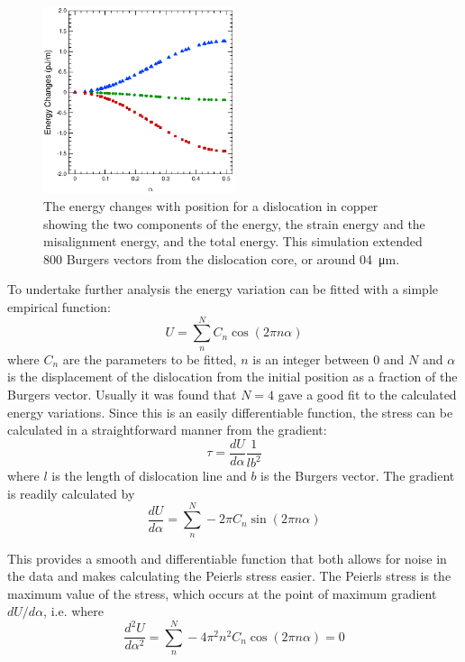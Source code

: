 \begin{figure}
\centering
\includegraphics[width=0.5\textwidth]{Copper_800_rel_energies}
\caption[The energy changes with dislocation position for  copper.]{The energy changes with position for a dislocation in copper showing the two components of the energy, the strain energy and the misalignment energy, and the total energy. This simulation extended \num{800} Burgers vectors from the dislocation core, or around \SI{04}{\micro\meter}.\label{fig:copper_800_rel_energies}}
\end{figure}




To undertake further analysis the energy variation can be fitted with a simple empirical function:
\begin{equation}
U = \sum^N_n C_n \cos (2 \pi n \alpha) \label{eqn:empirical_function}
\end{equation}
where $C_n$ are the parameters to be fitted, $n$ is an integer between $0$ and $N$ and $\alpha$ is the displacement of the dislocation from the initial position as a fraction of the Burgers vector. Usually it was found that $N=4$ gave a good fit to the calculated energy variations. Since this is an easily differentiable function, the stress can be calculated in a straightforward manner from the gradient:
\begin{equation}
\tau = \frac{dU}{d\alpha} \frac{1}{lb^2}
\end{equation}
where $l$ is the length of dislocation line and $b$ is the Burgers vector. The gradient is readily calculated by
\begin{equation}
\frac{dU}{d\alpha} = \sum_n^N - 2 \pi C_n \sin ( 2 \pi n \alpha )
\end{equation}

This provides a smooth and differentiable function that both allows for noise in the data and makes calculating the Peierls stress easier. The Peierls stress is the maximum value of the stress, which occurs at the point of maximum gradient $dU/d\alpha$, i.e. where
\begin{equation}
\frac{d^2U}{d\alpha^2} = \sum_n^N -4 \pi^2 n^2 C_n \cos ( 2 \pi n \alpha ) = 0
\end{equation}

